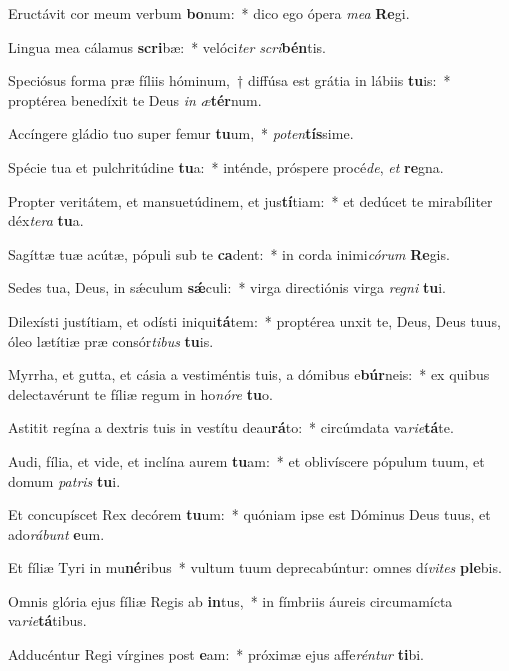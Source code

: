 \item Eructávit cor meum verbum \textbf{bo}num:~* dico ego ópera \textit{me}\textit{a} \textbf{Re}gi.
\item Lingua mea cálamus \textbf{scri}bæ:~* velóci\textit{ter} \textit{scri}\textbf{bén}tis.
\item Speciósus forma præ fíliis hóminum,~† diffúsa est grátia in lábiis \textbf{tu}is:~* proptérea benedíxit te Deus \textit{in} \textit{æ}\textbf{tér}num.
\item Accíngere gládio tuo super femur \textbf{tu}um,~* \textit{pot}\textit{en}\textbf{tís}sime.
\item Spécie tua et pulchritúdine \textbf{tu}a:~* inténde, próspere procé\textit{de}, \textit{et} \textbf{re}gna.
\item Propter veritátem, et mansuetúdinem, et jus\textbf{tí}tiam:~* et dedúcet te mirabíliter déx\textit{te}\textit{ra} \textbf{tu}a.
\item Sagíttæ tuæ acútæ, pópuli sub te \textbf{ca}dent:~* in corda inimi\textit{có}\textit{rum} \textbf{Re}gis.
\item Sedes tua, Deus, in sǽculum \textbf{sǽ}culi:~* virga directiónis virga \textit{re}\textit{gni} \textbf{tu}i.
\item Dilexísti justítiam, et odísti iniqui\textbf{tá}tem:~* proptérea unxit te, Deus, Deus tuus, óleo lætítiæ præ consór\textit{ti}\textit{bus} \textbf{tu}is.
\item Myrrha, et gutta, et cásia a vestiméntis tuis, a dómibus e\textbf{búr}neis:~* ex quibus delectavérunt te fíliæ regum in ho\textit{nó}\textit{re} \textbf{tu}o.
\item Astitit regína a dextris tuis in vestítu deau\textbf{rá}to:~* circúmdata va\textit{ri}\textit{e}\textbf{tá}te.
\item Audi, fília, et vide, et inclína aurem \textbf{tu}am:~* et oblivíscere pópulum tuum, et domum \textit{pa}\textit{tris} \textbf{tu}i.
\item Et concupíscet Rex decórem \textbf{tu}um:~* quóniam ipse est Dóminus Deus tuus, et ado\textit{rá}\textit{bunt} \textbf{e}um.
\item Et fíliæ Tyri in mu\textbf{né}ribus~* vultum tuum deprecabúntur: omnes dí\textit{vi}\textit{tes} \textbf{ple}bis.
\item Omnis glória ejus fíliæ Regis ab \textbf{in}tus,~* in fímbriis áureis circumamícta va\textit{ri}\textit{e}\textbf{tá}tibus.
\item Adducéntur Regi vírgines post \textbf{e}am:~* próximæ ejus affe\textit{rén}\textit{tur} \textbf{ti}bi.
